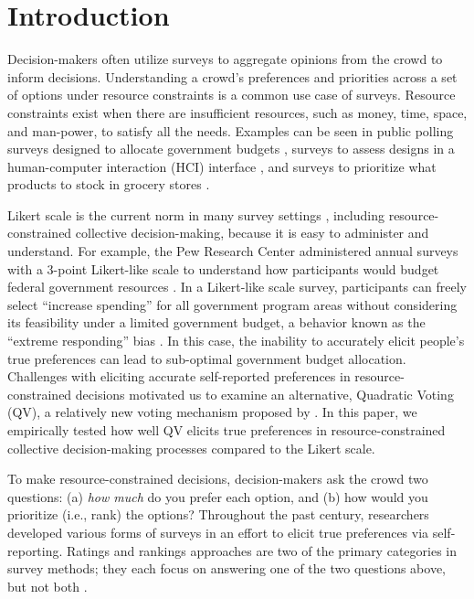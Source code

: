 \section{Introduction}
Decision-makers often utilize surveys to aggregate opinions from the crowd to inform decisions. Understanding a crowd's preferences and priorities across a set of options under resource constraints is a common use case of surveys. Resource constraints exist when there are insufficient resources, such as money, time, space, and man-power, to satisfy all the needs. Examples can be seen in public polling surveys designed to allocate government budgets \cite{pew_spending}, surveys to assess designs in a human-computer interaction (HCI) interface \cite{ledo2018evaluation}, and surveys to prioritize what products to stock in grocery stores \cite{nielsen}. 

Likert scale is the current norm in many survey settings \cite{moors2016two}, including resource-constrained collective decision-making, because it is easy to administer and understand. For example, the Pew Research Center administered annual surveys with a 3-point Likert-like scale to understand how participants would budget federal government resources \cite{pew_spending}. In a Likert-like scale survey, participants can freely select ``increase spending'' for all government program areas without considering its feasibility under a limited government budget, a behavior known as the ``extreme responding'' bias \cite{batchelor2016extreme, furnham1986response, meisenberg2008acquiescent}. In this case, the inability to accurately elicit people's true preferences can lead to sub-optimal government budget allocation. Challenges with eliciting accurate self-reported preferences in resource-constrained decisions motivated us to examine an alternative, Quadratic Voting (QV), a relatively new voting mechanism proposed by \textcite{posner2018radical}. In this paper, we empirically tested how well QV elicits true preferences in resource-constrained collective decision-making processes compared to the Likert scale.  

To make resource-constrained decisions, decision-makers ask the crowd two questions: (a) \textit{how much} do you prefer each option, and (b) how would you prioritize (i.e., rank) the options? Throughout the past century, researchers developed various forms of surveys in an effort to elicit true preferences via self-reporting. Ratings and rankings approaches are two of the primary categories in survey methods; they each focus on answering one of the two questions above, but not both \cite{moors2016two}. 

